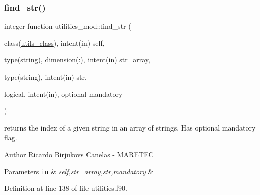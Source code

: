 \mbox{\label{namespaceutilities__mod_ad446cce78a6509db0e839439a0e84564}} 
\subsubsection{\texorpdfstring{find\+\_\+str()}{find\_str()}}
{\footnotesize\ttfamily integer function utilities\+\_\+mod\+::find\+\_\+str (\begin{DoxyParamCaption}\item[{class(\mbox{\hyperlink{structutilities__mod_1_1utils__class}{utils\+\_\+class}}), intent(in)}]{self,  }\item[{type(string), dimension(\+:), intent(in)}]{str\+\_\+array,  }\item[{type(string), intent(in)}]{str,  }\item[{logical, intent(in), optional}]{mandatory }\end{DoxyParamCaption})\hspace{0.3cm}{\ttfamily [private]}}



returns the index of a given string in an array of strings. Has optional mandatory flag. 

\begin{DoxyAuthor}{Author}
Ricardo Birjukovs Canelas -\/ M\+A\+R\+E\+T\+EC 
\end{DoxyAuthor}

\begin{DoxyParams}[1]{Parameters}
\mbox{\tt in}  & {\em self,str\+\_\+array,str,mandatory} & \\
\hline
\end{DoxyParams}


Definition at line 138 of file utilities.\+f90.


